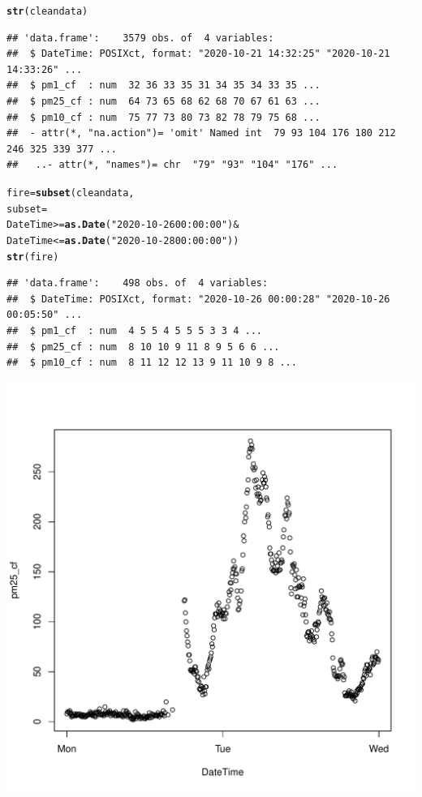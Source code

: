 \documentclass{article}\usepackage[]{graphicx}\usepackage[]{color}
\makeatletter
\def\maxwidth{ %
  \ifdim\Gin@nat@width>\linewidth
    \linewidth
  \else
    \Gin@nat@width
  \fi
}
\newcommand{\hlstr}[1]{\textcolor[rgb]{0.192,0.494,0.8}{#1}}%
\newcommand{\hlopt}[1]{\textcolor[rgb]{0,0,0}{#1}}%
\newcommand{\hlstd}[1]{\textcolor[rgb]{0.345,0.345,0.345}{#1}}%
\newcommand{\hlkwb}[1]{\textcolor[rgb]{0.69,0.353,0.396}{#1}}%
\newcommand{\hlkwc}[1]{\textcolor[rgb]{0.333,0.667,0.333}{#1}}%
\newcommand{\hlkwd}[1]{\textcolor[rgb]{0.737,0.353,0.396}{\textbf{#1}}}%
\newenvironment{kframe}{%
 \def\at@end@of@kframe{}%
 \ifinner\ifhmode%
  \def\at@end@of@kframe{\end{minipage}}%
  \begin{minipage}{\columnwidth}%
 \fi\fi%
 \def\FrameCommand##1{\hskip\@totalleftmargin \hskip-\fboxsep
 \colorbox{shadecolor}{##1}\hskip-\fboxsep
     \hskip-\linewidth \hskip-\@totalleftmargin \hskip\columnwidth}%
 \MakeFramed {\advance\hsize-\width
   \@totalleftmargin\z@ \linewidth\hsize
   \@setminipage}}%
 {\par\unskip\endMakeFramed%
 \at@end@of@kframe}
\newenvironment{knitrout}{}{} %
\def\maxwidth{ %
  \ifdim\Gin@nat@width>\linewidth
    \linewidth
  \else
    \Gin@nat@width
  \fi
}
\makeatother
\begin{document}
\begin{knitrout}
\color{fgcolor}\begin{kframe}
\begin{alltt}
\hlkwd{str}\hlstd{(cleandata)}
\end{alltt}
\begin{verbatim}
## 'data.frame':	3579 obs. of  4 variables:
##  $ DateTime: POSIXct, format: "2020-10-21 14:32:25" "2020-10-21 14:33:26" ...
##  $ pm1_cf  : num  32 36 33 35 31 34 35 34 33 35 ...
##  $ pm25_cf : num  64 73 65 68 62 68 70 67 61 63 ...
##  $ pm10_cf : num  75 77 73 80 73 82 78 79 75 68 ...
##  - attr(*, "na.action")= 'omit' Named int  79 93 104 176 180 212 246 325 339 377 ...
##   ..- attr(*, "names")= chr  "79" "93" "104" "176" ...
\end{verbatim}
\begin{alltt}
\hlstd{fire} \hlkwb{=} \hlkwd{subset}\hlstd{(cleandata,}
  \hlkwc{subset}\hlstd{=}
    \hlstd{DateTime} \hlopt{>=} \hlkwd{as.Date}\hlstd{(}\hlstr{"2020-10-26 00:00:00"}\hlstd{)} \hlopt{&}
    \hlstd{DateTime} \hlopt{<=} \hlkwd{as.Date}\hlstd{(}\hlstr{"2020-10-28 00:00:00"}\hlstd{))}
\hlkwd{str}\hlstd{(fire)}
\end{alltt}
\begin{verbatim}
## 'data.frame':	498 obs. of  4 variables:
##  $ DateTime: POSIXct, format: "2020-10-26 00:00:28" "2020-10-26 00:05:50" ...
##  $ pm1_cf  : num  4 5 5 4 5 5 5 3 3 4 ...
##  $ pm25_cf : num  8 10 10 9 11 8 9 5 6 6 ...
##  $ pm10_cf : num  8 11 12 12 13 9 11 10 9 8 ...
\end{verbatim}
\end{kframe}
\end{knitrout}

\begin{knitrout}
\color{fgcolor}
\includegraphics[width=\maxwidth]{figure/unnamed-chunk-13-1} 

\end{knitrout}
\end{document}
